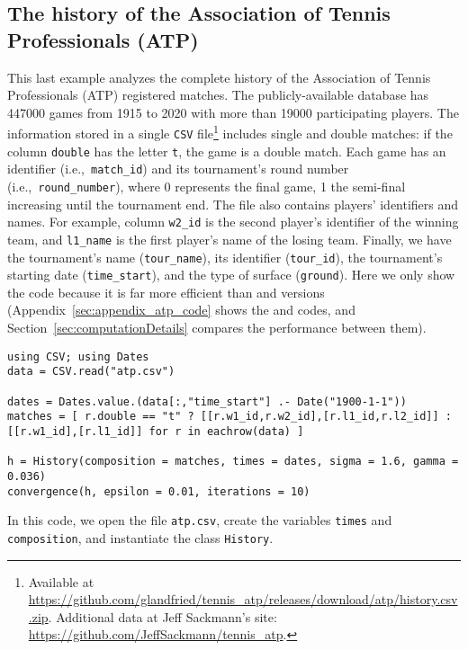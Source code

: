 \documentclass[article]{jss}
\begin{document}
\subsection{The history of the Association of Tennis Professionals (ATP)} \label{sec:atp}

This last example analyzes the complete history of the Association of Tennis Professionals (ATP) registered matches. 
The publicly-available database has \num{447000} games from 1915 to 2020 with more than \num{19000} participating players. 
The information stored in a single \texttt{CSV} file\footnote{Available at \url{https://github.com/glandfried/tennis_atp/releases/download/atp/history.csv.zip}. Additional data at Jeff Sackmann's site: \url{https://github.com/JeffSackmann/tennis_atp}.} includes single and double matches: if the column \texttt{double} has the letter \texttt{t}, the game is a double match. 
Each game has an identifier (i.e.,~\texttt{match\_id}) and its tournament's round number (i.e.,~\texttt{round\_number}), where 0 represents the final game, 1 the semi-final increasing until the tournament end. 
The file also contains players’ identifiers and names. For example, column \texttt{w2\_id} is the second player's identifier of the winning team, and \texttt{l1\_name} is the first player's name of the losing team. 
Finally, we have the tournament's name (\texttt{tour\_name}), its identifier (\texttt{tour\_id}), the tournament's starting date (\texttt{time\_start}), and the type of surface (\texttt{ground}). 
Here we only show the  code because it is far more efficient than  and  versions (Appendix~\ref{sec:appendix_atp_code} shows the  and  codes, and Section~\ref{sec:computationDetails} compares the performance between them). 
%
\begin{lstlisting}[captionpos=b,backgroundcolor=\color{julia!60},label=lst:atp, caption={The history of the Association of Tennis Professionals.}, belowskip=0cm]
using CSV; using Dates
data = CSV.read("atp.csv")

dates = Dates.value.(data[:,"time_start"] .- Date("1900-1-1")) 
matches = [ r.double == "t" ? [[r.w1_id,r.w2_id],[r.l1_id,r.l2_id]] : [[r.w1_id],[r.l1_id]] for r in eachrow(data) ]   

h = History(composition = matches, times = dates, sigma = 1.6, gamma = 0.036)
convergence(h, epsilon = 0.01, iterations = 10)
\end{lstlisting}
%
In this code, we open the file \texttt{atp.csv}, create the variables \texttt{times} and \texttt{composition}, and instantiate the class \texttt{History}. 
\end{document}
